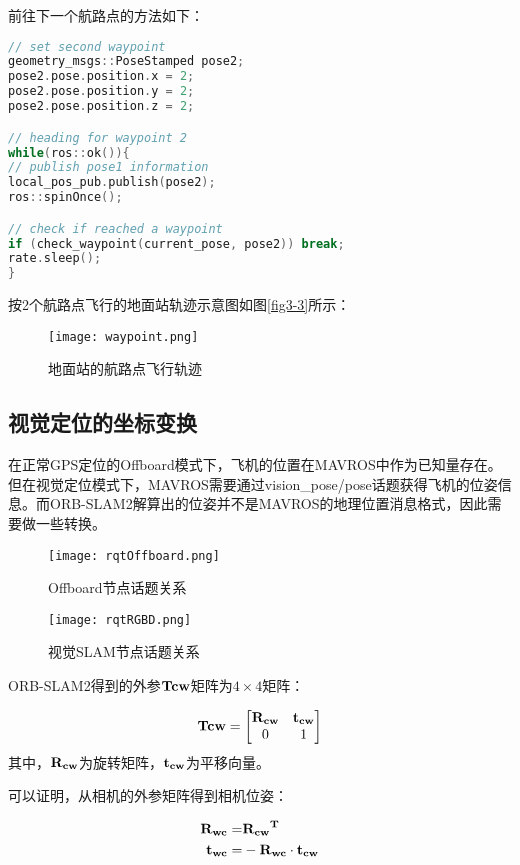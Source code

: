 前往下一个航路点的方法如下：

\begin{lstlisting}[language={C++}]
// set second waypoint
geometry_msgs::PoseStamped pose2;
pose2.pose.position.x = 2;
pose2.pose.position.y = 2;
pose2.pose.position.z = 2;

// heading for waypoint 2
while(ros::ok()){
// publish pose1 information
local_pos_pub.publish(pose2);
ros::spinOnce();

// check if reached a waypoint
if (check_waypoint(current_pose, pose2)) break;
rate.sleep();
}
\end{lstlisting}

按2个航路点飞行的地面站轨迹示意图如图\ref{fig3-3}所示：

\begin{figure}[!ht]
	\centering
	\texttt{[image: waypoint.png]}
	\caption{地面站的航路点飞行轨迹}
	\label{fig4-3}
\end{figure}

\subsection{视觉定位的坐标变换} \label{4.2.3}

在正常GPS定位的Offboard模式下，飞机的位置在MAVROS中作为已知量存在。但在视觉定位模式下，MAVROS需要通过vision\_pose/pose话题获得飞机的位姿信息。而ORB-SLAM2解算出的位姿并不是MAVROS的地理位置消息格式，因此需要做一些转换。

\begin{figure}[!ht]
	\centering
	\texttt{[image: rqtOffboard.png]}
	\caption{Offboard节点话题关系}
	\label{fig4-4}
\end{figure}

\begin{figure}[!ht]
	\centering
	\texttt{[image: rqtRGBD.png]}
	\caption{视觉SLAM节点话题关系}
	\label{fig4-5}
\end{figure}

ORB-SLAM2得到的外参$\bf{Tcw}$矩阵为$4 \times 4$矩阵：

$$
\bf{Tcw}=\begin{bmatrix}
\bf{R_{cw}} & \bf{t_{cw}}\\0 & 1
\end{bmatrix}
$$
其中，$\bf{R_{cw}}$为旋转矩阵，$\bf{t_{cw}}$为平移向量。

可以证明，从相机的外参矩阵得到相机位姿：

$$
\begin{aligned}
\bf{R_{wc}}= &\bf{R_{cw}}^T\\
\bf{t_{wc}}= &-\bf{R_{wc}} \cdot  \bf{t_{cw}}
\end{aligned}
$$

